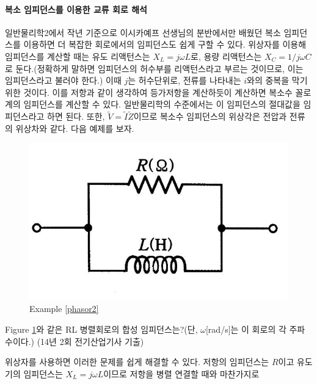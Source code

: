 \paragraph{복소 임피던스를 이용한 교류 회로 해석}
일반물리학2에서 작년 기준으로 이시카예프 선생님의 분반에서만 배웠던 복소 임피던스를 이용하면 더 복잡한 회로에서의 임피던스도 쉽게 구할 수 있다. 위상자를 이용해 임피던스를 계산할 때는 유도 리액턴스는 $X_L = j\omega L$로, 용량 리액턴스는 $X_C=1/j\omega C$로 둔다.(정확하게 말하면 임피던스의 허수부를 리액턴스라고 부르는 것이므로, 이는 임피던스라고 불러야 한다.) 이때 $j$는 허수단위로, 전류를 나타내는 $i$와의 중복을 막기 위한 것이다. 이를 저항과 같이 생각하여 등가저항을 계산하듯이 계산하면 복소수 꼴로 계의 임피던스를 계산할 수 있다. 일반물리학의 수준에서는 이 임피던스의 절대값을 임피던스라고 하면 된다. 또한, $\tilde{V}=\tilde{I}\tilde{Z}$이므로 복소수 임피던스의 위상각은 전압과 전류의 위상차와 같다.
다음 예제를 보자.

\begin{example}\label{phasor2}
\begin{figure}[h]
\centering\includegraphics[scale=0.2]{Pictures/phasor2.jpg}
\caption{Example \ref{phasor2}}
\label{fig:phasor2}
\end{figure}
Figure \ref{fig:phasor2}와 같은 RL 병렬회로의 합성 임피던스는?(단, $\omega$[rad/s]는 이 회로의 각 주파수이다.) (14년 2회 전기산업기사 기출)
\end{example}
위상자를 사용하면 이러한 문제를 쉽게 해결할 수 있다. 저항의 임피던스는 $R$이고 유도기의 임피던스는 $X_L=j\omega L$이므로 저항을 병렬 연결할 때와 마찬가지로 

